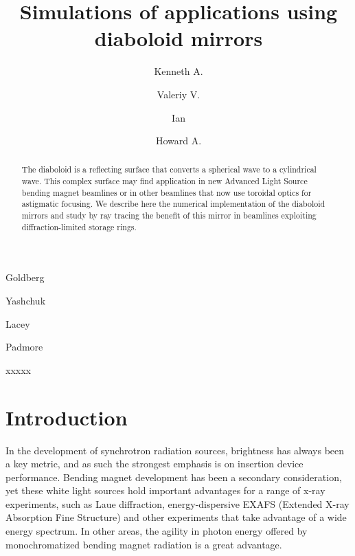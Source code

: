 \documentclass{iucr}       %
\newcommand{\inred}[1]{{\color{red}#1}}
\begin{document}




\title{Simulations of applications using diaboloid mirrors}

\author[a]{Kenneth A.}{Goldberg}
\author[a]{Valeriy V.}{Yashchuk}
\author[a]{Ian}{Lacey}
\author[a]{Howard A.}{Padmore}




\begin{synopsis}
xxxxx
\end{synopsis}

\begin{abstract}
The diaboloid is a reflecting surface that converts a spherical wave to a cylindrical wave. This complex surface may find application in new Advanced Light Source bending magnet beamlines or in other beamlines that now use toroidal optics for astigmatic focusing. We describe here the numerical implementation of the diaboloid mirrors and study by ray tracing the benefit of this mirror in beamlines exploiting diffraction-limited storage rings.
\end{abstract}

\section{Introduction}

In the development of synchrotron radiation sources, brightness has always been a key metric, and as such the strongest emphasis is on insertion device performance. Bending magnet development has been a secondary consideration, yet these white light sources hold important advantages for a range of x-ray experiments, such as Laue diffraction, energy-dispersive EXAFS \inred{(Extended X-ray Absorption Fine Structure)} and other experiments that take advantage of a wide energy spectrum. In other areas, the agility in photon energy offered by monochromatized bending magnet radiation is a great advantage. 
\end{document}
